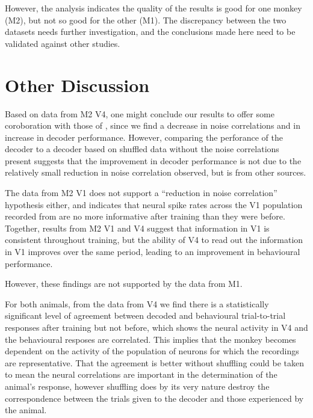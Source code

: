 However, the analysis indicates the quality of the results is good for one monkey (\ac{M2}), but not so good for the other (\ac{M1}).
The discrepancy between the two datasets needs further investigation, and the conclusions made here need to be validated against other studies.


\clearpage
\section{Other Discussion}

Based on data from \ac{M2} \ac{V4}, one might conclude our results to offer some coroboration with those of \citet{Gu2011}, since we find a decrease in noise correlations and in increase in decoder performance.
However, comparing the perforance of the decoder to a decoder based on shuffled data without the noise correlations present suggests that the improvement in decoder performance is not due to the relatively small reduction in noise correlation observed, but is from other sources.

The data from \ac{M2} \ac{V1} does not support a ``reduction in noise correlation'' hypothesis either, and indicates that neural spike rates across the \ac{V1} population recorded from are no more informative after training than they were before.
Together, results from \ac{M2} \ac{V1} and \ac{V4} suggest that information in \ac{V1} is consistent throughout training, but the ability of \ac{V4} to read out the information in \ac{V1} improves over the same period, leading to an improvement in behavioural performance.

However, these findings are not supported by the data from \ac{M1}.


For both animals, from the data from \ac{V4} we find there is a statistically significant level of agreement between decoded and behavioural trial-to-trial responses after training but not before, which shows the neural activity in \ac{V4} and the behavioural resposes are correlated.
This implies that the monkey becomes dependent on the activity of the population of neurons for which the recordings are representative.
That the agreement is better without shuffling could be taken to mean the neural correlations are important in the determination of the animal's response, however shuffling does by its very nature destroy the correspondence between the trials given to the decoder and those experienced by the animal.
